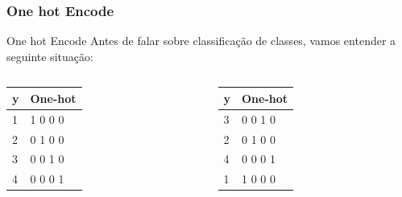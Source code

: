 \documentclass{beamer}
\begin{document}
\begin{frame}
	\frametitle{One hot Encode}
	\begin{block}{One hot Encode}
		Antes de falar sobre classificação de classes, vamos entender a seguinte situação:
		\begin{columns}
			\begin{column}{0.4 \textwidth}
				\begin{table}[]
					\begin{tabular}{|l|l|}
						\hline
						y & One-hot \\ \hline
						1 & 1 0 0 0 \\ \hline
						2 & 0 1 0 0 \\ \hline
						3 & 0 0 1 0 \\ \hline
						4 & 0 0 0 1 \\ \hline
					\end{tabular}
				\end{table}
			\end{column}
			\begin{column}{0.4 \textwidth}
				\begin{table}[]
					\begin{tabular}{|l|l|}
						\hline
						y & One-hot \\ \hline
						3 & 0 0 1 0 \\ \hline
						2 & 0 1 0 0 \\ \hline
						4 & 0 0 0 1 \\ \hline
						1 & 1 0 0 0 \\ \hline
					\end{tabular}
				\end{table}
			\end{column}
		\end{columns}


	\end{block}
\end{frame}
\end{document}
